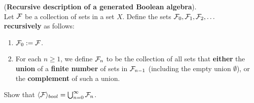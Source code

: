 \documentclass[11pt]{article}
\begin{document}
\begin{itemize}
\begin{example}
\begin{exercise} (\textbf{Recursive description of a generated Boolean algebra}). \citep{tao2011introduction} \\
Let ${\mathcal F}$ be a collection of sets in a set $X$. Define the sets ${\mathcal F}_0, {\mathcal F}_1, {\mathcal F}_2, \ldots$ \textbf{recursively} as follows:
\begin{enumerate}
\item ${\mathcal F}_0  := {\mathcal F}$.
\item For each $n \ge 1$, we define ${\mathcal F}_n$ to be the collection of all sets that \textbf{either} the \textbf{union} of a \textbf{finite number} of sets in ${\mathcal F}_{n-1}$
(including the empty union $\emptyset$), or the \textbf{complement} of such a union.
\end{enumerate}
Show that $\langle {\mathcal F} \rangle_{bool} =  \bigcup_{n=0}^{\infty}{\mathcal F}_{n}$.
\end{exercise}

\end{example}
\end{itemize}
\end{document}
